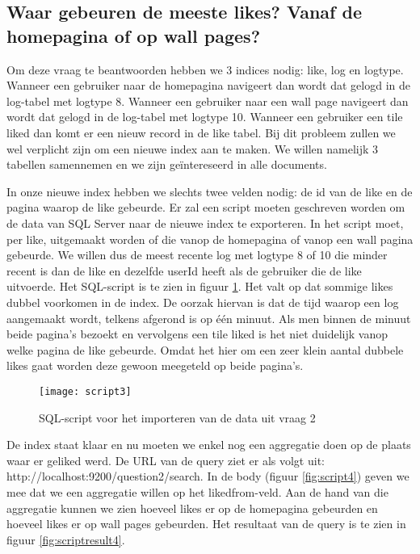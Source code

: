 \subsection{Waar gebeuren de meeste likes? Vanaf de homepagina of op wall pages?}
Om deze vraag te beantwoorden hebben we 3 indices nodig: like, log en logtype. Wanneer een gebruiker naar de homepagina navigeert dan wordt dat gelogd in de log-tabel met logtype 8. Wanneer een gebruiker naar een wall page navigeert dan wordt dat gelogd in de log-tabel met logtype 10. Wanneer een gebruiker een tile liked dan komt er een nieuw record in de like tabel. Bij dit probleem zullen we wel verplicht zijn om een nieuwe index aan te maken. We willen namelijk 3 tabellen samennemen en we zijn geïntereseerd in alle documents.

In onze nieuwe index hebben we slechts twee velden nodig: de id van de like en de pagina waarop de like gebeurde. Er zal een script moeten geschreven worden om de data van SQL Server naar de nieuwe index te exporteren. In het script moet, per like, uitgemaakt worden of die vanop de homepagina of vanop een wall pagina gebeurde. We willen dus de meest recente log met logtype 8 of 10 die minder recent is dan de like en dezelfde userId heeft als de gebruiker die de like uitvoerde. Het SQL-script is te zien in figuur \ref{fig:script3}. Het valt op dat sommige likes dubbel voorkomen in de index. De oorzak hiervan is dat de tijd waarop een log aangemaakt wordt, telkens afgerond is op één minuut. Als men binnen de minuut beide pagina's bezoekt en vervolgens een tile liked is het niet duidelijk vanop welke pagina de like gebeurde. Omdat het hier om een zeer klein aantal dubbele likes gaat worden deze gewoon meegeteld op beide pagina's.

\begin{figure}
	\centering
	\texttt{[image: script3]}
	\caption{SQL-script voor het importeren van de data uit vraag 2}
	\label{fig:script3}
\end{figure}

De index staat klaar en nu moeten we enkel nog een aggregatie doen op de plaats waar er geliked werd. De URL van de query ziet er als volgt uit: http://localhost:9200/question2/\textunderscore search. In de body (figuur \ref{fig:script4}) geven we mee dat we een aggregatie willen op het liked\textunderscore from-veld. Aan de hand van die aggregatie kunnen we zien hoeveel likes er op de homepagina gebeurden en hoeveel likes er op wall pages gebeurden. Het resultaat van de query is te zien in figuur \ref{fig:scriptresult4}.

